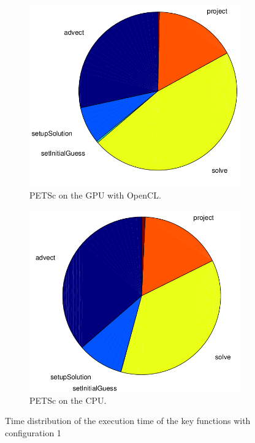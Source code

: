 \begin{figure}[ht]
	\center
	
	\begin{subfigure}{0.45\textwidth}
		\center
		\includegraphics[width=1.0\textwidth]{results/data/td_conf1_petsc_gpu}
		\caption{PETSc on the GPU with OpenCL.}
		\label{fig:td_conf1_petsc_gpu}
	\end{subfigure}
	\begin{subfigure}{0.45\textwidth}
		\center
		\includegraphics[width=1.0\textwidth]{results/data/td_conf1_petsc_cpu}
		\caption{PETSc on the CPU.}
		\label{fig:td_conf1_petsc_cpu}
	\end{subfigure}
	\caption{Time distribution of the execution time of the key functions
			with configuration 1}
	\label{fig:td_conf1}
	
\end{figure}


